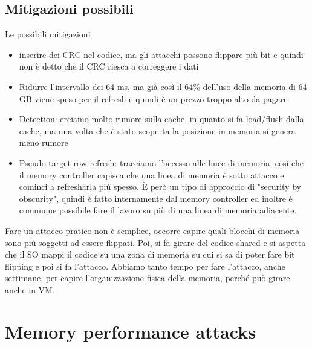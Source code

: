 \documentclass[12pt, oneside]{extbook} %
\begin{document}
\subsection{Mitigazioni possibili}
Le possibili mitigazioni
\begin{itemize}
\item inserire dei CRC nel codice, ma gli attacchi possono flippare più bit e quindi non è detto che il CRC riesca a correggere i dati
\item Ridurre l'intervallo dei 64 ms, ma già così il 64\% dell'uso della memoria di 64 GB viene speso per il refresh e quindi è un prezzo troppo alto da pagare
\item Detection: creiamo molto rumore sulla cache, in quanto si fa load/flush dalla cache, ma una volta che è stato scoperta la posizione in memoria si genera meno rumore
\item  Pseudo target row refresh: tracciamo l'accesso alle linee di memoria, così che il memory controller capisca che una linea di memoria è sotto attacco e cominci a refresharla più spesso. È però un tipo di approccio di "security by obscurity", quindi è fatto internamente dal memory controller ed inoltre è comunque possibile fare il lavoro su più di una linea di memoria adiacente.
\end{itemize}
Fare un attacco pratico non è semplice, occorre capire quali blocchi di memoria sono più soggetti ad essere flippati. Poi, si fa girare del codice shared e si aspetta che il SO mappi il codice su una zona di memoria su cui si sa di poter fare bit flipping e poi si fa l'attacco. Abbiamo tanto tempo per fare l'attacco, anche settimane, per capire l'organizzazione fisica della memoria, perché può girare anche in VM.

\section{Memory performance attacks}
\end{document}
